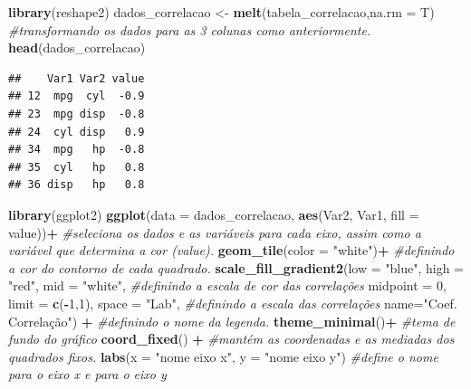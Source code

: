 \documentclass[
]{book}
\newenvironment{Shaded}{\begin{snugshade}}{\end{snugshade}}
\newcommand{\CommentTok}[1]{\textcolor[rgb]{0.56,0.35,0.01}{\textit{#1}}}
\newcommand{\DataTypeTok}[1]{\textcolor[rgb]{0.13,0.29,0.53}{#1}}
\newcommand{\DecValTok}[1]{\textcolor[rgb]{0.00,0.00,0.81}{#1}}
\newcommand{\KeywordTok}[1]{\textcolor[rgb]{0.13,0.29,0.53}{\textbf{#1}}}
\newcommand{\NormalTok}[1]{#1}
\newcommand{\OperatorTok}[1]{\textcolor[rgb]{0.81,0.36,0.00}{\textbf{#1}}}
\newcommand{\StringTok}[1]{\textcolor[rgb]{0.31,0.60,0.02}{#1}}
\begin{document}
\begin{Shaded}
\begin{Highlighting}[]
\KeywordTok{library}\NormalTok{(reshape2)}
\NormalTok{dados_correlacao <-}\StringTok{ }\KeywordTok{melt}\NormalTok{(tabela_correlacao,}\DataTypeTok{na.rm =}\NormalTok{ T) }\CommentTok{#transformando os dados para as 3 colunas como anteriormente.}
\KeywordTok{head}\NormalTok{(dados_correlacao)}
\end{Highlighting}
\end{Shaded}

\begin{verbatim}
##    Var1 Var2 value
## 12  mpg  cyl  -0.9
## 23  mpg disp  -0.8
## 24  cyl disp   0.9
## 34  mpg   hp  -0.8
## 35  cyl   hp   0.8
## 36 disp   hp   0.8
\end{verbatim}

\begin{Shaded}
\begin{Highlighting}[]
\KeywordTok{library}\NormalTok{(ggplot2)}
\KeywordTok{ggplot}\NormalTok{(}\DataTypeTok{data =}\NormalTok{ dados_correlacao, }\KeywordTok{aes}\NormalTok{(Var2, Var1, }\DataTypeTok{fill =}\NormalTok{ value))}\OperatorTok{+}\StringTok{ }\CommentTok{#seleciona os dados e as variáveis para cada eixo, assim como a variável que determina a cor (value).}
\StringTok{ }\KeywordTok{geom_tile}\NormalTok{(}\DataTypeTok{color =} \StringTok{"white"}\NormalTok{)}\OperatorTok{+}\StringTok{    }\CommentTok{#definindo a cor do contorno de cada quadrado.}
\StringTok{ }\KeywordTok{scale_fill_gradient2}\NormalTok{(}\DataTypeTok{low =} \StringTok{"blue"}\NormalTok{, }\DataTypeTok{high =} \StringTok{"red"}\NormalTok{, }\DataTypeTok{mid =} \StringTok{"white"}\NormalTok{, }\CommentTok{#definindo a escala de cor das correlações}
   \DataTypeTok{midpoint =} \DecValTok{0}\NormalTok{, }\DataTypeTok{limit =} \KeywordTok{c}\NormalTok{(}\OperatorTok{-}\DecValTok{1}\NormalTok{,}\DecValTok{1}\NormalTok{), }\DataTypeTok{space =} \StringTok{"Lab"}\NormalTok{, }\CommentTok{#definindo a escala das correlações}
   \DataTypeTok{name=}\StringTok{"Coef. Correlação"}\NormalTok{) }\OperatorTok{+}\StringTok{ }\CommentTok{#definindo o nome da legenda.}
\StringTok{  }\KeywordTok{theme_minimal}\NormalTok{()}\OperatorTok{+}\StringTok{ }\CommentTok{#tema de fundo do gráfico}
\StringTok{   }\KeywordTok{coord_fixed}\NormalTok{() }\OperatorTok{+}\StringTok{ }\CommentTok{#mantém as coordenadas e as mediadas dos quadrados fixos.}
\StringTok{  }\KeywordTok{labs}\NormalTok{(}\DataTypeTok{x =} \StringTok{"nome eixo x"}\NormalTok{, }\DataTypeTok{y =} \StringTok{"nome eixo y"}\NormalTok{) }\CommentTok{#define o nome para o eixo x e para o eixo y}
\end{Highlighting}
\end{Shaded}
\end{document}
